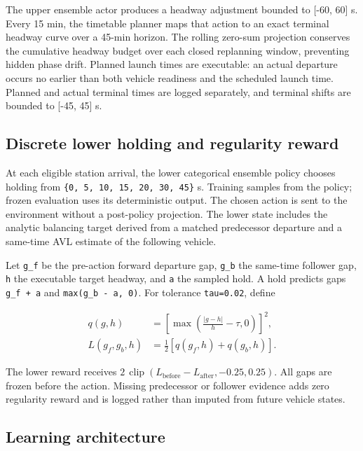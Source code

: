 \documentclass[preprint,12pt,authoryear,nopreprintline]{elsarticle}
\begin{document}
The upper ensemble actor produces a headway adjustment bounded to
{[}-60, 60{]} s. Every 15 min, the timetable planner maps that action to
an exact terminal headway curve over a 45-min horizon. The rolling
zero-sum projection conserves the cumulative headway budget over each
closed replanning window, preventing hidden phase drift. Planned launch
times are executable: an actual departure occurs no earlier than both
vehicle readiness and the scheduled launch time. Planned and actual
terminal times are logged separately, and terminal shifts are bounded to
{[}-45, 45{]} s.

\subsection{Discrete lower holding and regularity
reward}\label{discrete-lower-holding-and-regularity-reward}

At each eligible station arrival, the lower categorical ensemble policy
chooses holding from \texttt{\{0,\ 5,\ 10,\ 15,\ 20,\ 30,\ 45\}} s.
Training samples from the policy; frozen evaluation uses its
deterministic output. The chosen action is sent to the environment
without a post-policy projection. The lower state includes the analytic
balancing target derived from a matched predecessor departure and a
same-time AVL estimate of the following vehicle.

Let \texttt{g\_f} be the pre-action forward departure gap, \texttt{g\_b}
the same-time follower gap, \texttt{h} the executable target headway,
and \texttt{a} the sampled hold. A hold predicts gaps
\texttt{g\_f\ +\ a} and \texttt{max(g\_b\ -\ a,\ 0)}. For tolerance
\texttt{tau=0.02}, define

\[\begin{aligned}
q(g,h) &= \left[\max\left(\frac{|g-h|}{h}-\tau,0\right)\right]^2, \\
L(g_f,g_b,h) &= \frac{1}{2}[q(g_f,h)+q(g_b,h)].
\end{aligned}\]

The lower reward receives \(2\,\operatorname{clip}
(L_{\mathrm{before}}-L_{\mathrm{after}},
-0.25,0.25)\). All gaps are frozen before the action. Missing
predecessor or follower evidence adds zero regularity reward and is
logged rather than imputed from future vehicle states.

\subsection{Learning architecture}\label{learning-architecture}
\end{document}
